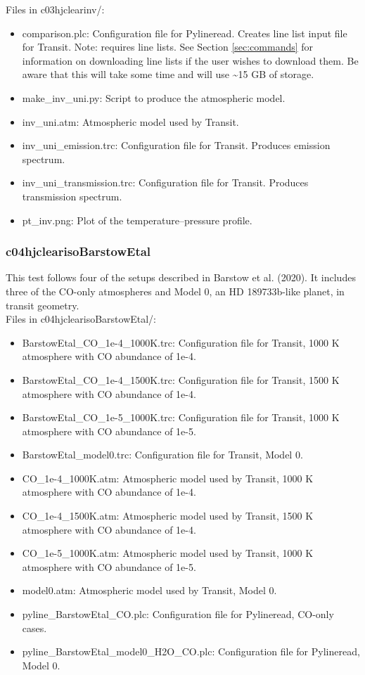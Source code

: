\documentclass[letterpaper, 12pt]{article}
\begin{document}
Files in c03hjclearinv/:
\begin{itemize} \itemsep0pt
  \item comparison.plc: Configuration file for Pylineread. Creates 
        line list input file for Transit. Note: requires line lists. See 
        Section \ref{sec:commands} for information on downloading line lists if 
        the user wishes to download them. Be aware that this will take some 
        time and will use {\sim}15 GB of storage.
  \item make{\_}inv{\_}uni.py: Script to produce the atmospheric model.
  \item inv{\_}uni.atm: Atmospheric model used by Transit.
  \item inv{\_}uni{\_}emission.trc: Configuration file for Transit. Produces 
        emission spectrum.
  \item inv{\_}uni{\_}transmission.trc: Configuration file for Transit. Produces 
        transmission spectrum.
  \item pt{\_}inv.png: Plot of the temperature--pressure profile.
\end{itemize}

\subsubsection{c04hjclearisoBarstowEtal}
\label{sec:comp-barstow-clear}
This test follows four of the setups described in Barstow et al. (2020).  It 
includes three of the CO-only atmospheres and Model 0, an HD 189733b-like 
planet, in transit geometry.\\

Files in c04hjclearisoBarstowEtal/:
\begin{itemize} \itemsep0pt
  \item BarstowEtal{\_}CO{\_}1e-4{\_}1000K.trc: Configuration file for Transit, 1000 K atmosphere with CO abundance of 1e-4.
  \item BarstowEtal{\_}CO{\_}1e-4{\_}1500K.trc: Configuration file for Transit, 1500 K atmosphere with CO abundance of 1e-4.
  \item BarstowEtal{\_}CO{\_}1e-5{\_}1000K.trc: Configuration file for Transit, 1000 K atmosphere with CO abundance of 1e-5.
  \item BarstowEtal{\_}model0.trc: Configuration file for Transit, Model 0.
  \item CO{\_}1e-4{\_}1000K.atm: Atmospheric model used by Transit, 1000 K atmosphere with CO abundance of 1e-4.
  \item CO{\_}1e-4{\_}1500K.atm: Atmospheric model used by Transit, 1500 K atmosphere with CO abundance of 1e-4.
  \item CO{\_}1e-5{\_}1000K.atm: Atmospheric model used by Transit, 1000 K atmosphere with CO abundance of 1e-5.
  \item model0.atm: Atmospheric model used by Transit, Model 0.
  \item pyline{\_}BarstowEtal{\_}CO.plc: Configuration file for Pylineread, CO-only cases.
  \item pyline{\_}BarstowEtal{\_}model0{\_}H2O{\_}CO.plc: Configuration file for Pylineread, Model 0.
\end{itemize}
\end{document}
